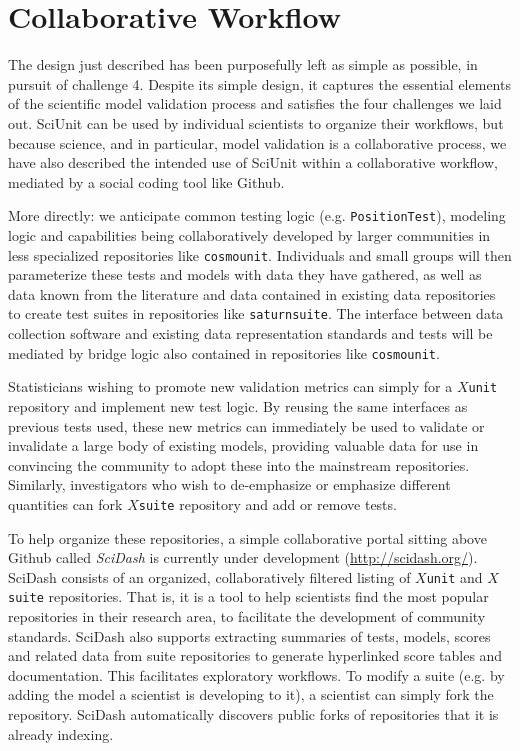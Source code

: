 \documentclass[9pt]{sig-alternate}
\newcommand{\verbx}[1]{\lstinline{#1}}
\begin{document}
\section{Collaborative Workflow}
The design just described has been purposefully left as simple as possible, in pursuit of challenge 4. Despite its simple design, it captures the essential elements of the scientific model validation process and satisfies the four challenges we laid out. SciUnit can be used by individual scientists to organize their workflows, but because science, and in particular, model validation is a collaborative process, we have also described the intended use of SciUnit within a collaborative workflow, mediated by a social coding tool like Github. 

More directly: we anticipate common testing logic (e.g. \verbx{PositionTest}), modeling logic and capabilities being collaboratively developed by larger communities in less specialized repositories like \verbx{cosmounit}. Individuals and small groups will then parameterize these tests and models with data they have gathered, as well as data known from the literature and data contained in existing data repositories to create test suites in repositories like \verbx{saturnsuite}. The interface between data collection software and existing data representation standards and tests will be mediated by bridge logic also contained in repositories like \verbx{cosmounit}.  %

Statisticians wishing to promote new validation metrics can simply for a $X$\verbx{unit} repository and implement new test logic. By reusing the same interfaces as previous tests used, these new metrics can immediately be used to validate or invalidate a large body of existing models, providing valuable data for use in convincing the community to adopt these into the mainstream repositories. Similarly, investigators who wish to de-emphasize or emphasize different quantities can fork $X$\verbx{suite} repository and add or remove tests.

To help organize these repositories, a simple collaborative portal sitting above Github called \textit{SciDash} is currently under development (\url{http://scidash.org/}). SciDash consists of an organized, collaboratively filtered listing of $X$\verbx{unit} and $X$\verbx{suite} repositories. That is, it is a tool to help scientists find the most popular repositories in their research area, to facilitate the development of community standards. SciDash also supports extracting summaries of tests, models, scores and related data from suite repositories to generate hyperlinked score tables and documentation. This facilitates exploratory workflows. To modify a suite (e.g. by adding the model a scientist is developing to it), a scientist can simply fork the repository. SciDash automatically discovers public forks of repositories that it is already indexing.
 
\end{document}
